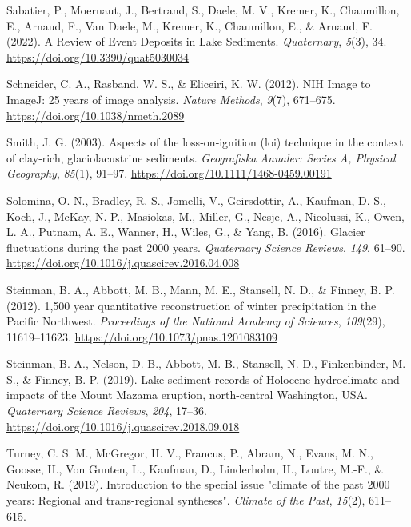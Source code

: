 \documentclass[
  letterpaper,
  DIV=11,
  numbers=noendperiod]{scrartcl}
\newlength{\cslhangindent}
\newlength{\cslentryspacingunit} %
\newenvironment{CSLReferences}[2] %
 {%
  \setlength{\parindent}{0pt}
  \ifodd #1
  \let\oldpar\par
  \def\par{\hangindent=\cslhangindent\oldpar}
  \fi
  \setlength{\parskip}{#2\cslentryspacingunit}
 }%
 {}
\begin{document}
\begin{CSLReferences}{1}{0}
\leavevmode{}%
Sabatier, P., Moernaut, J., Bertrand, S., Daele, M. V., Kremer, K.,
Chaumillon, E., Arnaud, F., Van Daele, M., Kremer, K., Chaumillon, E.,
\& Arnaud, F. (2022). {A Review of Event Deposits in Lake Sediments}.
\emph{Quaternary}, \emph{5}(3), 34.
\url{https://doi.org/10.3390/quat5030034}

\leavevmode{}%
Schneider, C. A., Rasband, W. S., \& Eliceiri, K. W. (2012). {NIH Image
to ImageJ: 25 years of image analysis}. \emph{Nature Methods},
\emph{9}(7), 671--675. \url{https://doi.org/10.1038/nmeth.2089}

\leavevmode{}%
Smith, J. G. (2003). {Aspects of the loss‐on‐ignition (loi) technique in
the context of clay‐rich, glaciolacustrine sediments}. \emph{Geografiska
Annaler: Series A, Physical Geography}, \emph{85}(1), 91--97.
\url{https://doi.org/10.1111/1468-0459.00191}

\leavevmode{}%
Solomina, O. N., Bradley, R. S., Jomelli, V., Geirsdottir, A., Kaufman,
D. S., Koch, J., McKay, N. P., Masiokas, M., Miller, G., Nesje, A.,
Nicolussi, K., Owen, L. A., Putnam, A. E., Wanner, H., Wiles, G., \&
Yang, B. (2016). {Glacier fluctuations during the past 2000 years}.
\emph{Quaternary Science Reviews}, \emph{149}, 61--90.
\url{https://doi.org/10.1016/j.quascirev.2016.04.008}

\leavevmode{}%
Steinman, B. A., Abbott, M. B., Mann, M. E., Stansell, N. D., \& Finney,
B. P. (2012). {1,500 year quantitative reconstruction of winter
precipitation in the Pacific Northwest}. \emph{Proceedings of the
National Academy of Sciences}, \emph{109}(29), 11619--11623.
\url{https://doi.org/10.1073/pnas.1201083109}

\leavevmode{}%
Steinman, B. A., Nelson, D. B., Abbott, M. B., Stansell, N. D.,
Finkenbinder, M. S., \& Finney, B. P. (2019). {Lake sediment records of
Holocene hydroclimate and impacts of the Mount Mazama eruption,
north-central Washington, USA}. \emph{Quaternary Science Reviews},
\emph{204}, 17--36.
\url{https://doi.org/10.1016/j.quascirev.2018.09.018}

\leavevmode{}%
Turney, C. S. M., McGregor, H. V., Francus, P., Abram, N., Evans, M. N.,
Goosse, H., Von Gunten, L., Kaufman, D., Linderholm, H., Loutre, M.-F.,
\& Neukom, R. (2019). {Introduction to the special issue "climate of the
past 2000 years: Regional and trans-regional syntheses"}. \emph{Climate
of the Past}, \emph{15}(2), 611--615.


\end{CSLReferences}
\end{document}
